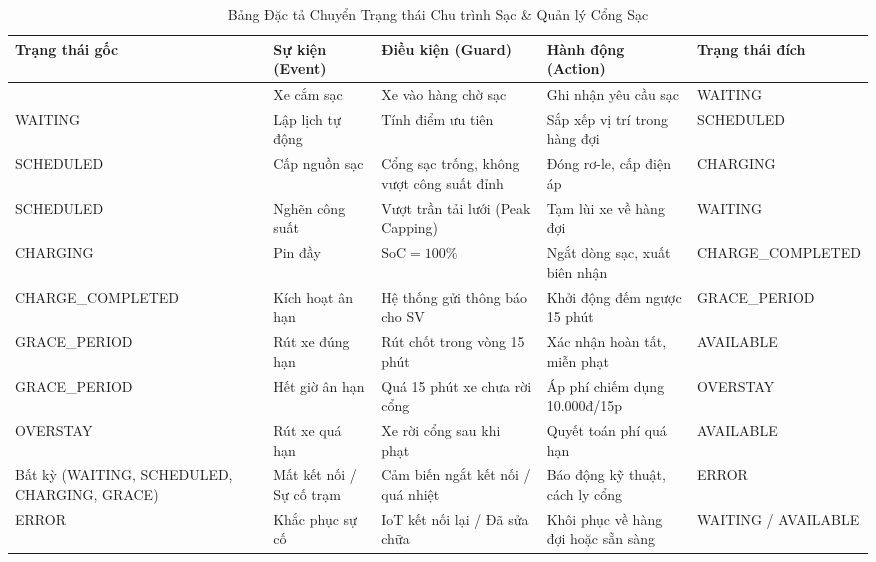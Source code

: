\documentclass[12pt,a4paper]{article}
\begin{document}
\begin{table}[H]
    \centering
    \small
    \renewcommand{\arraystretch}{1.3}
    \caption{Bảng Đặc tả Chuyển Trạng thái Chu trình Sạc \& Quản lý Cổng Sạc}
    \label{tab:state-charger-spec}
    \footnotesize
    \begin{tabularx}{\textwidth}{|>{\raggedright\arraybackslash}p{2.4cm}|>{\raggedright\arraybackslash}p{2.2cm}|>{\raggedright\arraybackslash}p{2.6cm}|>{\raggedright\arraybackslash}X|>{\raggedright\arraybackslash}p{2.4cm}|}
        \hline
        \textbf{Trạng thái gốc} & \textbf{Sự kiện (Event)} & \textbf{Điều kiện (Guard)} & \textbf{Hành động (Action)} & \textbf{Trạng thái đích} \\
        \hline
        [*] & Xe cắm sạc & Xe vào hàng chờ sạc & Ghi nhận yêu cầu sạc & WAITING \\
        WAITING & Lập lịch tự động & Tính điểm ưu tiên & Sắp xếp vị trí trong hàng đợi & SCHEDULED \\
        SCHEDULED & Cấp nguồn sạc & Cổng sạc trống, không vượt công suất đỉnh & Đóng rơ-le, cấp điện áp & CHARGING \\
        SCHEDULED & Nghẽn công suất & Vượt trần tải lưới (Peak Capping) & Tạm lùi xe về hàng đợi & WAITING \\
        CHARGING & Pin đầy & $\text{SoC} = 100\%$ & Ngắt dòng sạc, xuất biên nhận & CHARGE\_\allowbreak COMPLETED \\
        CHARGE\_\allowbreak COMPLETED & Kích hoạt ân hạn & Hệ thống gửi thông báo cho SV & Khởi động đếm ngược 15 phút & GRACE\_\allowbreak PERIOD \\
        GRACE\_\allowbreak PERIOD & Rút xe đúng hạn & Rút chốt trong vòng 15 phút & Xác nhận hoàn tất, miễn phạt & AVAILABLE \\
        GRACE\_\allowbreak PERIOD & Hết giờ ân hạn & Quá 15 phút xe chưa rời cổng & Áp phí chiếm dụng 10.000đ/15p & OVERSTAY \\
        OVERSTAY & Rút xe quá hạn & Xe rời cổng sau khi phạt & Quyết toán phí quá hạn & AVAILABLE \\
        Bất kỳ (WAITING, SCHEDULED, CHARGING, GRACE) & Mất kết nối / Sự cố trạm & Cảm biến ngắt kết nối / quá nhiệt & Báo động kỹ thuật, cách ly cổng & ERROR \\
        ERROR & Khắc phục sự cố & IoT kết nối lại / Đã sửa chữa & Khôi phục về hàng đợi hoặc sẵn sàng & WAITING / AVAILABLE \\
        \hline
    \end{tabularx}
\end{table}
\end{document}
